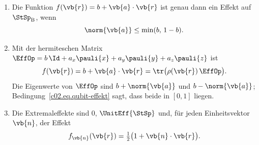 \begin{proposition}\label{c02.prop.qubit-effekte}
  \begin{enumerate}
    \item Die Funktion $f(\vb{r}) = b + \vb{a}\cdot\vb{r}$ ist genau dann ein Effekt auf
      $\StSp_{\mathrm{B}}$, wenn
      \begin{equation}\label{c02.eq.qubit-effekt}
        \norm{\vb{a}} \leq \min(b,\, 1-b) .
      \end{equation}
    \item Mit der hermiteschen Matrix
      $\EffOp = b\, \Id + a_x \pauli{x} + a_y \pauli{y} + a_z \pauli{z}$ ist
      \begin{equation}\label{c02.eq.spurformel}
        f(\vb{r}) = b + \vb{a}\cdot\vb{r} = \tr\bigl(\rho(\vb{r})\, \EffOp\bigr) .
      \end{equation}
      Die Eigenwerte von $\EffOp$ sind $b + \norm{\vb{a}}$ und $b - \norm{\vb{a}}$;
      Bedingung~\eqref{c02.eq.qubit-effekt} sagt, dass beide in $[0,1]$ liegen.
    \item Die Extremaleffekte sind $0$, $\UnitEff{\StSp}$ und, für jeden Einheitsvektor
      $\vb{n}$, der Effekt
      \begin{equation}\label{c02.eq.qubit-extremal}
        f_{\vb{n}}(\vb{r}) = \tfrac12\bigl(1 + \vb{n}\cdot\vb{r}\bigr) .
      \end{equation}
  \end{enumerate}
\end{proposition}
